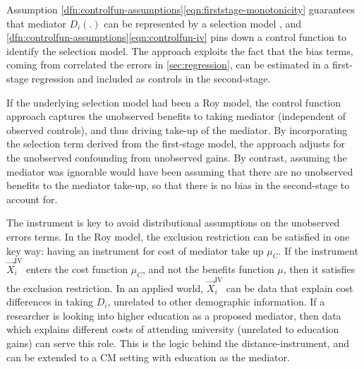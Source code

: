 Assumption \ref{dfn:controlfun-assumptions}\eqref{eqn:firststage-monotonicity} guarantees that mediator $D_i(.)$ can be represented by a selection model \citep{vytlacil2002independence}, and \ref{dfn:controlfun-assumptions}\eqref{eqn:controlfun-iv} pins down a control function to identify the selection model.
The approach exploits the fact that the bias terms, coming from correlated the errors in \autoref{sec:regression}, can be estimated in a first-stage regression and included as controls in the second-stage.

If the underlying selection model had been a Roy model, the control function approach captures the unobserved benefits to taking mediator (independent of observed controls), and thus driving take-up of the mediator.
By incorporating the selection term derived from the first-stage model, the approach adjusts for the unobserved confounding from unobserved gains.
By contrast, assuming the mediator was ignorable would have been assuming that there are no unobserved benefits to the mediator take-up, so that there is no bias in the second-stage to account for.

The instrument is key to avoid distributional assumptions on the unobserved errors terms.
In the Roy model, the exclusion restriction can be satisfied in one key way: having an instrument for cost of mediator take up $\mu_C$.
If the instrument $\vec X_i^{\text{IV}}$ enters the cost function $\mu_C$, and not the benefits function $\mu$, then it satisfies the exclusion restriction.
In an applied world, $\vec X_i^{\text{IV}}$ can be data that explain cost differences in taking $D_i$, unrelated to other demographic information.
If a researcher is looking into higher education as a proposed mediator, then data which explains different costs of attending university (unrelated to education gains) can serve this role.
This is the logic behind the \cite{card1993using} distance-instrument, and can be extended to a CM setting with education as the mediator.


